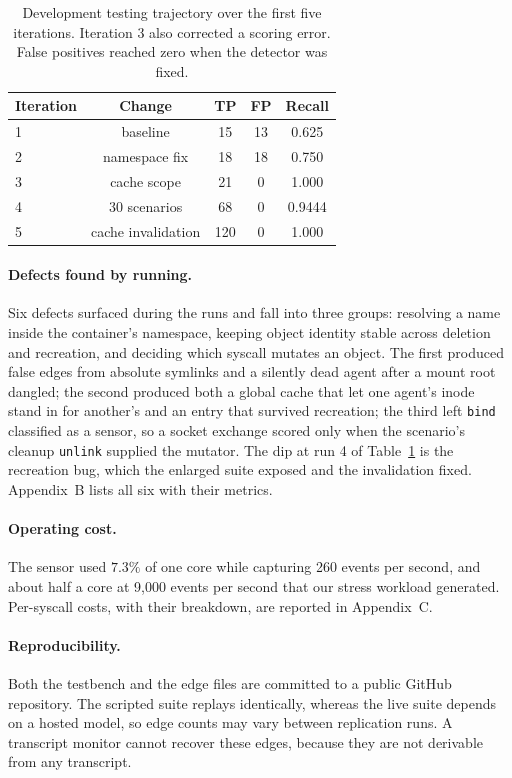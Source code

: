 \documentclass[11pt]{article}
\begin{document}
\begin{table}[t]
\centering
\small
\begin{tabular}{@{}lcccc@{}}
\toprule
Iteration & Change & TP & FP & Recall \\
\midrule
1 & baseline & 15 & 13 & 0.625 \\
2 & namespace fix & 18 & 18 & 0.750 \\
3 & cache scope & 21 & 0 & 1.000 \\
4 & 30 scenarios & 68 & 0 & 0.9444 \\
5 & cache invalidation & 120 & 0 & 1.000 \\
\bottomrule
\end{tabular}
\caption{Development testing trajectory over the first five iterations. Iteration 3 also corrected a scoring error. False positives reached zero when the detector was fixed.}
\label{tab:runs}
\end{table}

\paragraph{Defects found by running.} Six defects surfaced during the runs and fall into
three groups: resolving a name inside the container's namespace, keeping object identity
stable across deletion and recreation, and deciding which syscall mutates an object. The
first produced false edges from absolute symlinks and a silently dead agent after a mount
root dangled; the second produced both a global cache that let one agent's inode stand in
for another's and an entry that survived recreation; the third left \texttt{bind}
classified as a sensor, so a socket exchange scored only when the scenario's cleanup
\texttt{unlink} supplied the mutator. The dip at run 4 of Table~\ref{tab:runs} is the
recreation bug, which the enlarged suite exposed and the invalidation fixed. Appendix~B
lists all six with their metrics.

\paragraph{Operating cost.} The sensor used $7.3\%$ of one core while capturing 260 events per second, and about half a core at 9,000 events per second that our stress workload generated. Per-syscall costs, with their breakdown, are reported in Appendix~C.

\paragraph{Reproducibility.} Both the testbench and the edge files are committed to a public GitHub repository. The scripted suite replays identically, whereas the live suite depends on a hosted model, so edge counts may vary between replication runs. A transcript monitor cannot recover these edges, because they are not derivable from any transcript.
\end{document}
